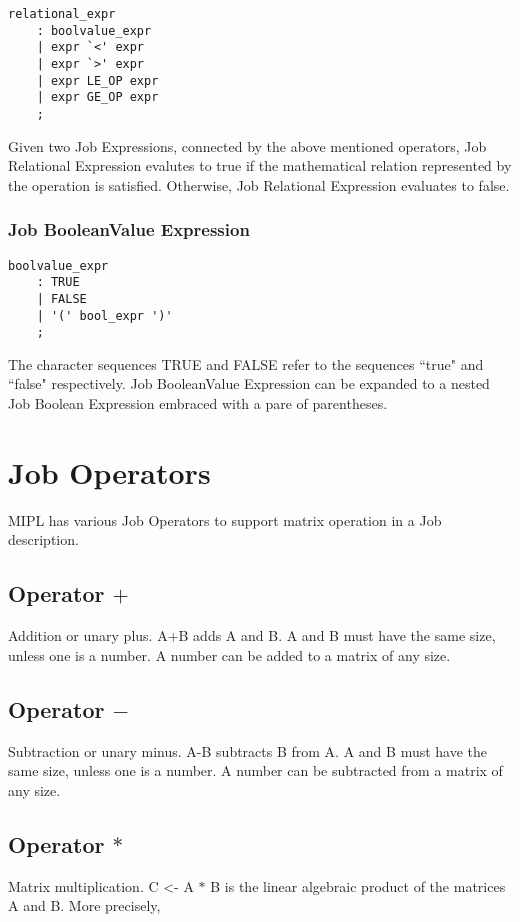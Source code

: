 \documentclass[prodmode,acmtecs]{acmsmall}
\begin{document}
\begin{lstlisting}
relational_expr
	: boolvalue_expr
	| expr `<' expr
	| expr `>' expr
	| expr LE_OP expr
	| expr GE_OP expr
	;
\end{lstlisting}

Given two Job Expressions, connected by the above mentioned operators, 
Job Relational Expression evalutes to true if the mathematical relation
represented by the operation is satisfied. Otherwise, Job Relational
Expression evaluates to false. 
\medskip


\subsubsection{Job BooleanValue Expression}

\begin{lstlisting}
boolvalue_expr
	: TRUE
	| FALSE
	| '(' bool_expr ')'
	;
\end{lstlisting}

The character sequences TRUE and FALSE refer to the sequences ``true"
and ``false" respectively.  Job BooleanValue Expression can be expanded
to a nested Job Boolean Expression embraced with a pare of parentheses.
\medskip


\section{Job Operators}
MIPL has various Job Operators to support matrix operation in a Job
description.

\subsection{Operator $+$}
Addition or unary plus. A+B adds A and B. A and B must have the same size,
unless one is a number. A number can be added to a matrix of any size.
\medskip

\subsection{Operator $-$}
Subtraction or unary minus. A-B subtracts B from A. A and B must have the
same size, unless one is a number. A number can be subtracted from a matrix
of any size.
\medskip

\subsection{Operator $*$}
Matrix multiplication. C <- A $*$ B is the linear algebraic product of the
matrices A and B. More precisely,
\end{document}
